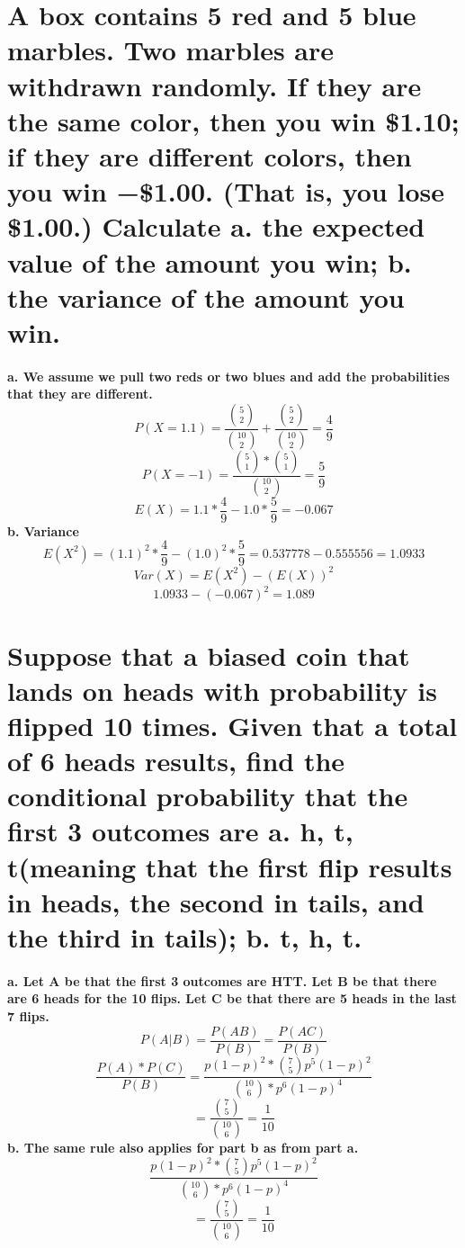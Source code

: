 \documentclass{article}
\begin{document}
\section{A box contains 5 red and 5 blue marbles. Two marbles are withdrawn randomly. If they are the same color, then you win \$1.10; if they are different colors, then you win −\$1.00. (That is, you lose \$1.00.)\newline
Calculate\newline
a. the expected value of the amount you win;\newline
b. the variance of the amount you win.
}
\paragraph{
a. We assume we pull two reds or two blues and add the probabilities that they are different.
$$P(X = 1.1) = \frac{{5 \choose 2}}{{10 \choose 2}} + \frac{{5 \choose 2}}{{10 \choose 2}} = \frac{4}{9}$$
$$P(X = -1) = \frac{{5 \choose 1} * {5 \choose 1}}{{10 \choose 2}} = \frac{5}{9}$$
$$E(X) = 1.1 * \frac{4}{9} - 1.0 * \frac{5}{9} = -0.067$$
b. Variance
$$E(X^2) = (1.1)^2 * \frac{4}{9} - (1.0)^2 * \frac{5}{9} = 0.537778 - 0.555556 = 1.0933$$
$$Var(X) = E(X^2) - (E(X))^2$$
$$1.0933 - (-0.067)^2 = 1.089$$
}\newpage
\setcounter{section}{52}
\section{Suppose that a biased coin that lands on heads with probability is flipped 10 times. Given that
a total of 6 heads results, find the conditional probability that the first 3 outcomes are\newline
a. h, t, t(meaning that the first flip results in heads, the second in tails, and the third in tails);\newline
b. t, h, t.}
\paragraph{
a. Let A be that the first 3 outcomes are HTT. Let B be that there are 6 heads for the 10 flips. Let C be that there are 5 heads in the last 7 flips.
$$P(A|B) = \frac{P(AB)}{P(B)} = \frac{P(AC)}{P(B)}$$
$$\frac{{P(A)}*{P(C)}}{P(B)} = \frac{p(1-p)^2*{7 \choose 5}p^5(1-p)^2}{{10 \choose 6}*p^6(1-p)^4}$$
$$=\frac{{7\choose 5}}{{10 \choose 6}} = \frac{1}{10}$$
b. The same rule also applies for part b as from part a.
$$\frac{p(1-p)^2*{7 \choose 5}p^5(1-p)^2}{{10 \choose 6}*p^6(1-p)^4}$$
$$=\frac{{7\choose 5}}{{10 \choose 6}} = \frac{1}{10}$$
}\newpage
\setcounter{section}{63}
\end{document}
